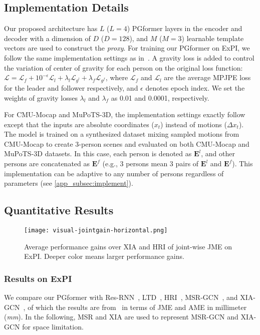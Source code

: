 \documentclass[10pt,twocolumn,letterpaper]{article}
\begin{document}
\subsection{Implementation Details} 
\label{subsec:implement}
Our proposed architecture has $L$ ($L=4$) PGformer layers in the encoder and decoder with a dimension of $D$ ($D=128$), and $M$ ($M=3$) learnable template vectors are used to construct the \textit{proxy}. 
For training our PGformer on ExPI, we follow the same implementation settings as in~\cite{guo2021multi}. 
A gravity loss is added to control the variation of center of gravity for each person on the original loss function: $\mathcal{L} = \mathcal{L}_f + 10^{-\epsilon} \mathcal{L}_l + \lambda_l \mathcal{L}_{g^l} + \lambda_f \mathcal{L}_{g^f}$, where $\mathcal{L}_f$ and $\mathcal{L}_l$ are the average MPJPE loss for the leader and follower respectively,  and $\epsilon$ denotes epoch index. 
We set the weights of gravity losses $\lambda_l$ and $\lambda_f$ as 0.01 and 0.0001, respectively. 


For CMU-Mocap and MuPoTS-3D, the implementation settings exactly follow~\cite{wang2021multiperson} except that the inputs are absolute coordinates ($x_t$) instead of motions ($\Delta x_t$). 
The model is trained on a synthesized dataset mixing sampled motions from CMU-Mocap to create 3-person scenes and evaluated on both CMU-Mocap and MuPoTS-3D datasets. 
In this case, each person is denoted as $\bm{E}^l$, and other persons are concatenated as $\bm{E}^f$ (e.g., 3 persons mean 3 pairs of $\bm{E}^l$ and $\bm{E}^f$). 
This implementation can be adaptive to any number of persons regardless of parameters (see \cref{app_subsec:implement}). 



\subsection{Quantitative Results}

\begin{figure}[t]
	\begin{center}
		\centerline{\texttt{[image: visual-jointgain-horizontal.png]}} \caption{Average performance gains over XIA and HRI of joint-wise JME on ExPI. Deeper color means larger performance gains.}
		\label{fig:jointgain}
	\end{center}
  \vskip -0.4in
\end{figure}

\subsubsection{Results on ExPI}
We compare our PGformer with Res-RNN~\cite{julieta2017motion}, LTD~\cite{mao2019learning}, HRI~\cite{mao2020history}, MSR-GCN~\cite{dang2021msr}, and XIA-GCN~\cite{guo2021multi}, 
of which the results are from~\cite{guo2021multi} in terms of JME and AME in millimeter (\textit{mm}). 
In the following, MSR and XIA are used to represent MSR-GCN and XIA-GCN for space limitation. 
\end{document}
